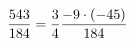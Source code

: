 \documentclass[preview]{standalone}
\begin{document}
\begin{align*}
\special{dvisvgm:raw <g id='unique000'>}\frac{543}{184} = \frac{3}{4} \frac{-9 \cdot (-45)}{184}\special{dvisvgm:raw </g>}
\end{align*}
\end{document}
